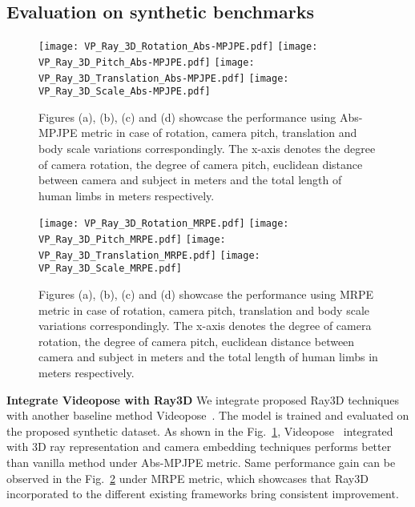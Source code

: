 \documentclass[10pt,twocolumn,letterpaper]{article}
\begin{document}
\subsection{Evaluation on synthetic benchmarks}
\begin{figure}
  \centering
  \texttt{[image: VP\_Ray\_3D\_Rotation\_Abs-MPJPE.pdf]}
  \texttt{[image: VP\_Ray\_3D\_Pitch\_Abs-MPJPE.pdf]}
  \texttt{[image: VP\_Ray\_3D\_Translation\_Abs-MPJPE.pdf]}
  \texttt{[image: VP\_Ray\_3D\_Scale\_Abs-MPJPE.pdf]}
  \caption{Figures (a), (b), (c) and (d) showcase the performance using Abs-MPJPE metric in case of rotation, camera pitch, translation and body scale variations correspondingly. The x-axis denotes the degree of camera rotation, the degree of camera pitch, euclidean distance between camera and subject in meters and the total length of human limbs in meters respectively.}
  \label{fig:Extrinsic_1_VP_Ray_3D}
\end{figure}

\begin{figure}
  \centering
  \texttt{[image: VP\_Ray\_3D\_Rotation\_MRPE.pdf]}
  \texttt{[image: VP\_Ray\_3D\_Pitch\_MRPE.pdf]}
  \texttt{[image: VP\_Ray\_3D\_Translation\_MRPE.pdf]}
  \texttt{[image: VP\_Ray\_3D\_Scale\_MRPE.pdf]}
  \caption{Figures (a), (b), (c) and (d) showcase the performance using MRPE metric in case of rotation, camera pitch, translation and body scale variations correspondingly. The x-axis denotes the degree of camera rotation, the degree of camera pitch, euclidean distance between camera and subject in meters and the total length of human limbs in meters respectively.}
  \label{fig:Extrinsic_2_VP_Ray_3D}
\end{figure}
\noindent\textbf{Integrate Videopose with Ray3D}
We integrate proposed Ray3D techniques with another baseline method Videopose~\cite{dario2019videopose}. The model is trained and evaluated on the proposed synthetic dataset. As shown in the Fig.~\ref{fig:Extrinsic_1_VP_Ray_3D}, Videopose~\cite{dario2019videopose} integrated with 3D ray representation and camera embedding techniques performs better than vanilla method under Abs-MPJPE metric. Same performance gain can be observed in the Fig.~\ref{fig:Extrinsic_2_VP_Ray_3D} under MRPE metric, which showcases that Ray3D incorporated to the different existing frameworks bring consistent improvement.
\end{document}
